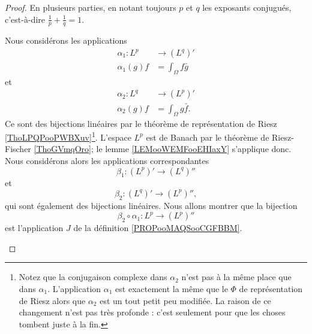 \begin{proof}
	En plusieurs parties, en notant toujours \( p\) et \( q\) les exposants conjugués, c'est-à-dire \( \frac{1}{ p }+\frac{1}{ q }=1\).
	\begin{subproof}

		Nous considérons les applications
		\begin{equation}
			\begin{aligned}
				\alpha_1\colon L^p & \to (L^q)'            \\
				\alpha_1(g)f       & =\int_{\Omega}f\bar g
			\end{aligned}
		\end{equation}
		et
		\begin{equation}
			\begin{aligned}
				\alpha_2\colon L^q & \to (L^p)'             \\
				\alpha_2(g)f       & =\int_{\Omega}g\bar f.
			\end{aligned}
		\end{equation}
		Ce sont des bijections linéaires par le théorème de représentation de Riesz \ref{ThoLPQPooPWBXuv}\footnote{Notez que la conjugaison complexe dans \( \alpha_2\) n'est pas à la même place que dans \( \alpha_1\). L'application \( \alpha_1\) est exactement la même que le \( \Phi\) de représentation de Riesz alors que \( \alpha_2\) est un tout petit peu modifiée. La raison de ce changement n'est pas très profonde : c'est seulement pour que les choses tombent juste à la fin.}. L'espace  \( L^p\) est de Banach par le théorème de Riesz-Fischer \ref{ThoGVmqOro}; le lemme \ref{LEMooWEMFooEHIaxY} s'applique donc. Nous considérons alors les applications correspondantes
		\begin{equation}
			\beta_1\colon (L^p)'\to (L^q)''
		\end{equation}
		et
		\begin{equation}
			\beta_2\colon (L^q)'\to (L^p)'',
		\end{equation}
		qui sont également des bijections linéaires. Nous allons montrer que la bijection
		\begin{equation}
			\beta_2\circ \alpha_1\colon L^p\to (L^p)''
		\end{equation}
		est l'application \( J\) de la définition \ref{PROPooMAQSooCGFBBM}.


\end{subproof}
\end{proof}
